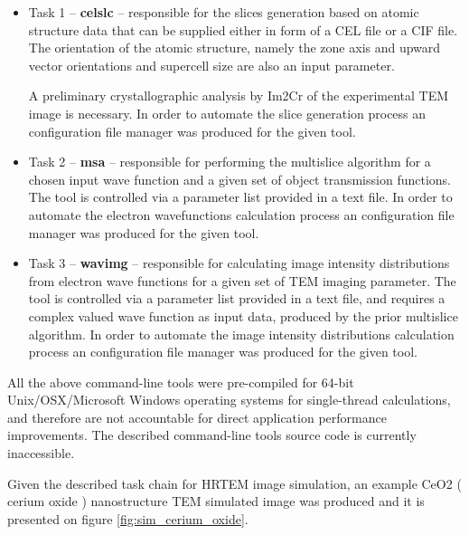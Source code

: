 \documentclass[
  oneside,
  11pt, a4paper,
  footinclude=true,
  headinclude=true,
  cleardoublepage=empty
]{scrbook}
\begin{document}
	\begin{itemize}
	    \item Task 1 -- \textbf{celslc} -- responsible for the slices generation based on atomic structure data that can be supplied either in form of a CEL file or a CIF file. The orientation of the atomic structure, namely the  
	    zone axis and upward vector orientations and supercell size are also an input parameter.\par 
	    A preliminary crystallographic analysis by Im2Cr  \citep{asilva2016} of the experimental TEM image is necessary. In order to automate the slice generation process an configuration file manager was produced for the given tool.
	    \item Task 2 -- \textbf{msa} -- responsible for performing the multislice algorithm for a chosen input wave function and a given set of object transmission functions. The tool is controlled via a parameter list provided in a text file. In order to automate the electron wavefunctions calculation process an configuration file manager was produced for the given tool.
	    \item Task 3 -- \textbf{wavimg} -- responsible for  calculating image intensity distributions from electron wave functions for a given set of TEM imaging parameter. 
	    The tool is controlled via a parameter list provided in a text file, and requires a complex valued wave function as input data, produced by the prior multislice algorithm.
	    In order to automate the image intensity distributions calculation process an configuration file manager was produced for the given tool.
	\end{itemize}
	
	
	All the above command-line tools were pre-compiled for 64-bit Unix/OSX/Microsoft Windows operating systems for single-thread calculations, and therefore are not accountable for direct application performance improvements. The described command-line tools source code is currently inaccessible. \par 
	
	Given the described task chain for HRTEM image simulation, an example CeO2 ( cerium oxide ) nanostructure TEM simulated image was produced and it is presented on figure \ref{fig:sim_cerium_oxide}.
	
	
\end{document}
